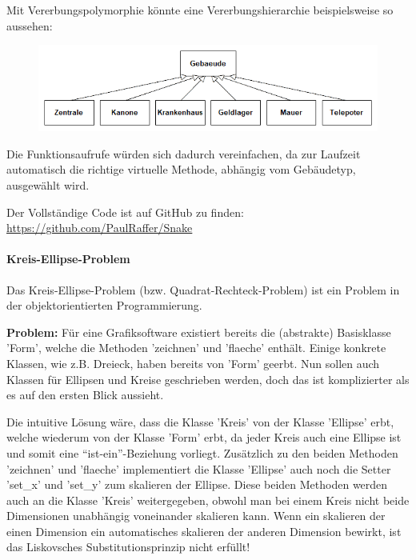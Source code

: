 					Mit Vererbungspolymorphie könnte eine Vererbungshierarchie beispielsweise so aussehen:
					\begin{figure}[H]
						\includegraphics[width=\textwidth]{polymorphie/universell/vererbung/beispiele/snake/gebaeude.png}
					\end{figure}
					
					Die Funktionsaufrufe würden sich dadurch vereinfachen, da zur Laufzeit automatisch die richtige virtuelle
					Methode, abhängig vom Gebäudetyp, ausgewählt wird.
					\UseRawInputEncoding{}
					
					Der Vollständige Code ist auf GitHub zu finden: \url{https://github.com/PaulRaffer/Snake}
				
			\paragraph{Kreis-Ellipse-Problem}
				Das Kreis-Ellipse-Problem (bzw. Quadrat-Rechteck-Problem) ist ein Problem in der objektorientierten
				Programmierung.
				
				{\bfseries Problem:}
					Für eine Grafiksoftware existiert bereits die (abstrakte) Basisklasse 'Form', welche die Methoden
					'zeichnen' und 'flaeche' enthält. Einige konkrete Klassen, wie z.B. Dreieck, haben bereits von 'Form'
					geerbt. Nun sollen auch Klassen für Ellipsen und Kreise geschrieben werden, doch das ist komplizierter
					als es auf den ersten Blick aussieht.
					
					Die intuitive Lösung wäre, dass die Klasse 'Kreis' von der Klasse 'Ellipse' erbt, welche wiederum von
					der Klasse 'Form' erbt, da jeder Kreis auch eine Ellipse ist und somit eine ``ist-ein''-Beziehung
					vorliegt. Zusätzlich zu den beiden Methoden 'zeichnen' und 'flaeche' implementiert die Klasse 'Ellipse'
					auch noch die Setter 'set\_x' und 'set\_y' zum skalieren der Ellipse. Diese beiden Methoden werden auch
					an die Klasse 'Kreis' weitergegeben, obwohl man bei einem Kreis nicht beide Dimensionen unabhängig
					voneinander skalieren kann. Wenn ein skalieren der einen Dimension ein automatisches skalieren der anderen
					Dimension bewirkt, ist das Liskovsches Substitutionsprinzip nicht erfüllt!
				
